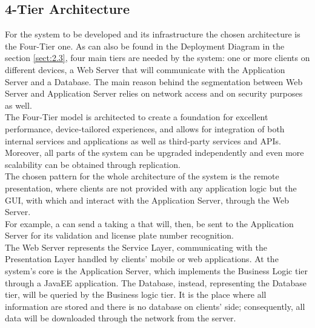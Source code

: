 \documentclass[../../../DD.tex]{subfiles}
\begin{document}
	
	\subsection{4-Tier Architecture\label{subsect:2.6.1}}
	For the system to be developed and its infrastructure the chosen architecture is the Four-Tier one. As can also be found in the Deployment Diagram in the section \ref{sect:2.3}, four main tiers are needed by the system: one or more clients on different devices, a Web Server that will communicate with the Application Server and a Database. The main reason behind the segmentation between Web Server and Application Server relies on network access and on security purposes as well.\\
	The Four‑Tier model is architected to create a foundation for excellent performance, device‑tailored experiences, and allows for integration of both internal services and applications as well as third‑party services and APIs. Moreover, all parts of the system can be upgraded independently and even more scalability can be obtained through replication. \\
	
	The chosen pattern for the whole architecture of the system is the remote presentation, where clients are not provided with any application logic but the GUI, with which  and  interact with the Application Server, through the Web Server. \\
	For example, a  can send a  taking a  that will, then, be sent to the Application Server for its validation and license plate number recognition. \\
	
	The Web Server represents the Service Layer, communicating with the Presentation Layer handled by clients' mobile or web applications. At the system's core is the Application Server, which implements the Business Logic tier through a JavaEE application. The Database, instead, representing the Database tier, will be queried by the Business logic tier. It is the place where all information are stored and there is no database on clients' side; consequently, all data will be downloaded through the network from the server.
	
\end{document}
